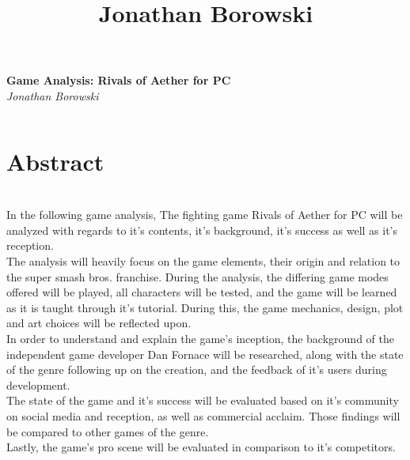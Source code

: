 \documentclass{article}
\begin{document}
\begin{titlepage}
   \begin{center}
      \Large\textbf{Game Analysis: Rivals of Aether for PC}\\
      \large\textit{Jonathan Borowski}
   \end{center}
\end{titlepage}
\title{Jonathan Borowski}
$  $\chapter{Abstract}\\
In the following game analysis, The fighting game Rivals of Aether for PC will be analyzed with regards to it's contents, it's background, it's success as well as it's reception.\\
The analysis will heavily focus on the game elements, their origin and relation to the super smash bros. franchise. During the analysis, the differing game modes offered will be played, all characters will be tested, and the game will be learned as it is taught through it's tutorial. During this, the game mechanics, design, plot and art choices will be reflected upon.\\
In order to understand and explain the game's inception, the background of the independent game developer Dan Fornace will be researched, along with the state of the genre following up on the creation, and the feedback of it's users during development.\\
The state of the game and it's success will be evaluated based on it's community on social media and reception, as well as commercial acclaim. Those findings will be compared to other games of the genre.\\Lastly, the game's pro scene will be evaluated in comparison to it's competitors.\\
\newpage
\end{document}
